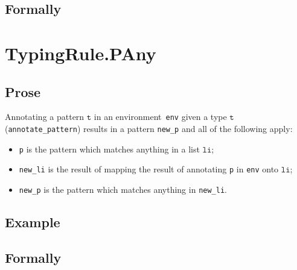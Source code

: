 \documentclass{book}
\newcommand\vt[0]{\texttt{t}}
\newcommand\vli[0]{\texttt{li}}
\begin{document}
\begin{itemize}

\begin{emptyformal}
    \subsection{Formally}
\end{emptyformal}


\section{TypingRule.PAny\label{sec:TypingRule.PAny}}

  \subsection{Prose}
   Annotating a pattern $\vt$ in an environment~\texttt{env} given a type $\vt$ (\texttt{annotate\_pattern}) results in a pattern \texttt{new\_p} and all of the following apply:
   \begin{itemize}
   \item \texttt{p} is the pattern which matches anything in a list $\vli$;
   \item \texttt{new\_li} is the result of mapping the result of annotating \texttt{p} in \texttt{env} onto $\vli$;
   \item \texttt{new\_p} is the pattern which matches anything in \texttt{new\_li}.
   \end{itemize}

  \subsection{Example}



\begin{emptyformal}
    \subsection{Formally}
\end{emptyformal}



\end{itemize}
\end{document}
